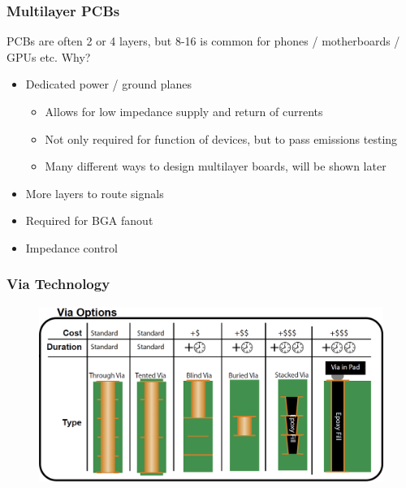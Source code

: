 \documentclass[t]{beamer}
\begin{document}
\begin{frame}
\frametitle{Multilayer PCBs}
PCBs are often 2 or 4 layers, but 8-16 is common for phones / motherboards / GPUs etc. Why?
\begin{itemize}
	\item Dedicated power / ground planes
		\begin{itemize}
			\item Allows for low impedance supply and return of currents
			\item Not only required for function of devices, but to pass emissions testing
			\item Many different ways to design multilayer boards, will be shown later
		\end{itemize}
	\item More layers to route signals
	\item Required for BGA fanout
	\item Impedance control
\end{itemize}
\end{frame}
\begin{frame}
\frametitle{Via Technology}
\begin{figure}
	\includegraphics[width=\linewidth]{vias.png}
\end{figure}
\end{frame}
\end{document}
